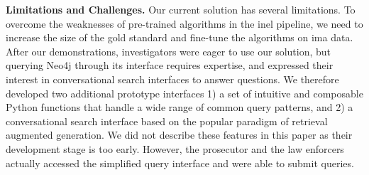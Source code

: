 \textbf{Limitations and Challenges.}
Our current solution has several limitations. To overcome the weaknesses of pre-trained algorithms in the \ac{inel} pipeline, we need to increase the size of the gold standard and fine-tune the algorithms on \ac{ima} data. %
%
After our demonstrations, investigators were eager to use our solution, but querying Neo4j through its interface requires expertise, and expressed their interest in conversational search interfaces to answer questions. We therefore developed two additional prototype interfaces 1) a set of intuitive and composable Python functions that handle a wide range of common query patterns,
and 2) a conversational search interface based on the popular paradigm of retrieval augmented generation. We did not describe these features in this paper as their development stage is too early. However, the prosecutor and the law enforcers actually accessed the simplified query interface and were able to submit queries.    

